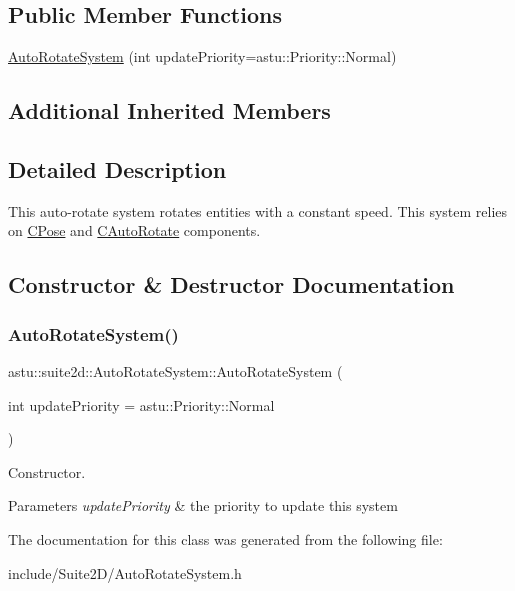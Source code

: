 \subsection*{Public Member Functions}
\begin{DoxyCompactItemize}
\item 
\hyperlink{classastu_1_1suite2d_1_1AutoRotateSystem_a61d7b59f9cadba07d3a49efd2433e4bc}{Auto\+Rotate\+System} (int update\+Priority=astu\+::\+Priority\+::\+Normal)
\end{DoxyCompactItemize}
\subsection*{Additional Inherited Members}


\subsection{Detailed Description}
This auto-\/rotate system rotates entities with a constant speed. This system relies on \hyperlink{classastu_1_1suite2d_1_1CPose}{C\+Pose} and \hyperlink{classastu_1_1suite2d_1_1CAutoRotate}{C\+Auto\+Rotate} components. 

\subsection{Constructor \& Destructor Documentation}
\mbox{\label{classastu_1_1suite2d_1_1AutoRotateSystem_a61d7b59f9cadba07d3a49efd2433e4bc}} 
\subsubsection{\texorpdfstring{Auto\+Rotate\+System()}{AutoRotateSystem()}}
{\footnotesize\ttfamily astu\+::suite2d\+::\+Auto\+Rotate\+System\+::\+Auto\+Rotate\+System (\begin{DoxyParamCaption}\item[{int}]{update\+Priority = {\ttfamily astu\+:\+:Priority\+:\+:Normal} }\end{DoxyParamCaption})}

Constructor.


\begin{DoxyParams}{Parameters}
{\em update\+Priority} & the priority to update this system \\
\hline
\end{DoxyParams}


The documentation for this class was generated from the following file\+:\begin{DoxyCompactItemize}
\item 
include/\+Suite2\+D/Auto\+Rotate\+System.\+h\end{DoxyCompactItemize}
